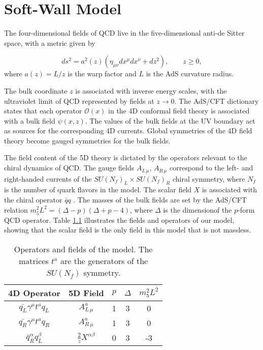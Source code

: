 \chapter{Soft-Wall Model\label{sec:Soft-Wall-Model}}

The four-dimensional fields of QCD live in the five-dimensional
anti-de Sitter space, with a metric given by

\begin{equation}
ds^{2}=a^{2}(z)(\eta_{\mu\nu}dx^{\mu}dx^{\nu}+dz^{2}),\qquad z\geq0,
\end{equation}
where $a(z)=L/z$ is the warp factor and $L$ is the AdS curvature
radius.

The bulk coordinate $z$ is associated with inverse energy scales, with the ultraviolet limit of QCD represented by fields at $z\rightarrow0$\cite{kwee-lebed-pion}. 
The AdS/CFT dictionary \cite{maldacena,klebanov-witten} states that each operator $\mathcal{O}(x)$ in the 4D conformal field theory is associated with a bulk field $\psi(x,z)$. 
The values of the bulk fields at the UV boundary act as sources for the corresponding
4D currents. 
Global symmetries of the 4D field theory become gauged symmetries for the bulk fields. 

The field content of the 5D theory is dictated by the operators relevant to the chiral dynamics of QCD. 
The gauge fields $A_{L\,\mu},\, A_{R\,\mu}$ correspond to the left- and right-handed currents of the $SU(N_{f})_{L}\times SU(N_{f})_{R}$ chiral symmetry, where $N_{f}$ is the number of quark flavors in
the model. 
The scalar field $X$ is associated with the chiral operator $\bar{q}q$ \cite{stephanov-katz-son}. 
The masses of the bulk fields are set by the AdS/CFT relation \cite{colangelo-light-scalar-mesons} $m_{5}^{2}L^{2}=(\Delta-p)(\Delta+p-4)$, where $\Delta$ is the dimensionof the $p$-form QCD operator. 
Table \ref{tab:Operators-and-fields} illustrates the fields and operators of our model, showing that the scalar field is the only field in this model that is not massless.

\begin{table}
\begin{center}
\begin{tabular}{|c|c|c|c|c|}
\hline 
4D Operator & 5D Field & $p$ & $\Delta$ & $m_{5}^{2}L^{2}$\tabularnewline
\hline 
\hline 
$\bar{q_{L}}\gamma^{\mu}t^{a}q_{L}$ & $A_{L\,\mu}^{a}$ & 1 & 3 & 0\tabularnewline
\hline 
$\bar{q_{R}}\gamma^{\mu}t^{a}q_{R}$ & $A_{R\,\mu}^{a}$ & 1 & 3 & 0\tabularnewline
\hline 
$\bar{q}_{R}^{\alpha}q_{L}^{\beta}$ & $\frac{2}{z}X^{\alpha\beta}$ & 0 & 3 & -3\tabularnewline
\hline 
\end{tabular}
\end{center}

\caption{Operators and fields of the model. The matrices $t^{a}$ are the generators of the $SU(N_{f})$ symmetry. 
\label{tab:Operators-and-fields}}
\end{table}

